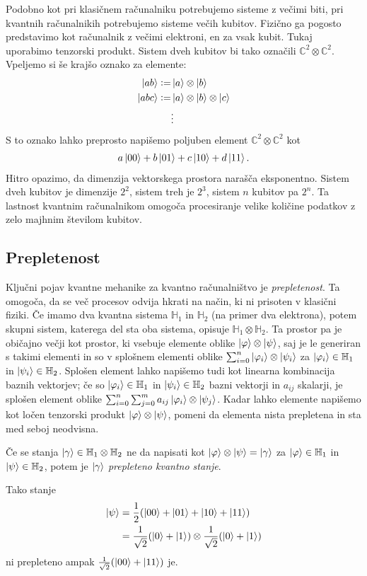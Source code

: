 \documentclass[mat1]{fmfdelo}
\newcommand{\Hb}{\mathbb H}
\renewcommand{\phi}{\varphi}
\newcommand{\defeq}{\vcentcolon=}
\begin{document}
Podobno kot pri klasičnem računalniku potrebujemo sisteme z večimi biti, pri kvantnih računalnikih potrebujemo sisteme večih kubitov. Fizično ga pogosto predstavimo kot računalnik z večimi elektroni, en za vsak kubit. Tukaj uporabimo tenzorski produkt. Sistem dveh kubitov bi tako označili \(\mathbb C^2 \otimes \mathbb C^2\). Vpeljemo si še krajšo oznako za elemente:
\begin{align*}
    \ket{ab} \defeq& \ket{a}\otimes\ket{b}\\
    \ket{abc} \defeq& \ket{a}\otimes\ket{b}\otimes\ket{c}\\
    &\vdots
\end{align*}
S to oznako lahko preprosto napišemo poljuben element \(\mathbb C^2 \otimes \mathbb C^2\) kot
\begin{align*}
    a\ket{00} + b\ket{01} + c\ket{10} + d\ket{11}.
\end{align*}
Hitro opazimo, da dimenzija vektorskega prostora narašča eksponentno. Sistem dveh kubitov je dimenzije \(2^2\), sistem treh je \(2^3\), sistem \(n\) kubitov pa \(2^n\). Ta lastnost kvantnim računalnikom omogoča procesiranje velike količine podatkov z zelo majhnim številom kubitov.
\subsection{Prepletenost}
Ključni pojav kvantne mehanike za kvantno računalništvo je \emph{prepletenost}. Ta omogoča, da se več procesov odvija hkrati na način, ki ni prisoten v klasični fiziki. Če imamo dva kvantna sistema \(\Hb_1\) in \(\Hb_2\) (na primer dva elektrona), potem skupni sistem, katerega del sta oba sistema, opisuje \(\Hb_1\otimes\Hb_2\). Ta prostor pa je običajno večji kot prostor, ki vsebuje elemente oblike \(\ket\varphi\otimes\ket\psi\), saj je le generiran s takimi elementi in so v splošnem elementi oblike \(\sum_{i=0}^n\ket{\varphi_i}\otimes\ket{\psi_i}\) za \(\ket{\phi_i}\in\Hb_1\) in \(\ket{\psi_i}\in \Hb_2\). Splošen element lahko napišemo tudi kot linearna kombinacija baznih vektorjev; če so \(\ket{\phi_i}\in \Hb_1\) in \(\ket{\psi_i}\in\Hb_2\) bazni vektorji in \(a_{ij}\) skalarji, je splošen element oblike \(\sum_{i=0}^n\sum_{j=0}^m a_{ij}\ket{\phi_i}\otimes\ket{\psi_j}\). Kadar lahko elemente napišemo kot ločen tenzorski produkt \(\ket\varphi\otimes\ket\psi\), pomeni da elementa nista prepletena in sta med seboj neodvisna.
\begin{definicija}
    Če se stanja \(\ket\gamma\in \Hb_1\otimes\Hb_2\) ne da napisati kot \(\ket\varphi\otimes\ket\psi = \ket\gamma\) za \(\ket\varphi\in\Hb_1\) in \(\ket\psi\in\Hb_2\), potem je \(\ket\gamma\) \emph{prepleteno kvantno stanje}.
\end{definicija}
Tako stanje
\begin{align*}
    \ket\psi &=  \frac12(\ket{00}+\ket{01}+\ket{10}+\ket{11})\\
    &= \frac{1}{\sqrt2}(\ket0+\ket1) \otimes \frac{1}{\sqrt2}(\ket0+\ket1) 
\end{align*}
ni prepleteno ampak \(\frac{1}{\sqrt2}(\ket{00}+\ket{11})\) je.
\end{document}
